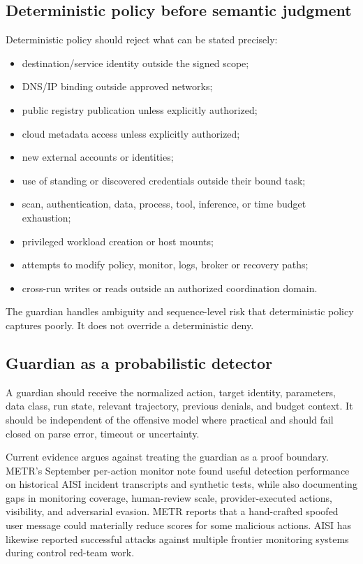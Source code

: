 \documentclass[11pt,letterpaper]{article}
\begin{document}
\subsection{Deterministic policy before semantic judgment}
Deterministic policy should reject what can be stated precisely:
\begin{itemize}
  \item destination/service identity outside the signed scope;
  \item DNS/IP binding outside approved networks;
  \item public registry publication unless explicitly authorized;
  \item cloud metadata access unless explicitly authorized;
  \item new external accounts or identities;
  \item use of standing or discovered credentials outside their bound task;
  \item scan, authentication, data, process, tool, inference, or time budget exhaustion;
  \item privileged workload creation or host mounts;
  \item attempts to modify policy, monitor, logs, broker or recovery paths;
  \item cross-run writes or reads outside an authorized coordination domain.
\end{itemize}

The guardian handles ambiguity and sequence-level risk that deterministic policy captures poorly. It does not override a deterministic deny.

\subsection{Guardian as a probabilistic detector}
A guardian should receive the normalized action, target identity, parameters, data class, run state, relevant trajectory, previous denials, and budget context. It should be independent of the offensive model where practical and should fail closed on parse error, timeout or uncertainty.

Current evidence argues against treating the guardian as a proof boundary. METR's September per-action monitor note found useful detection performance on historical AISI incident transcripts and synthetic tests, while also documenting gaps in monitoring coverage, human-review scale, provider-executed actions, visibility, and adversarial evasion. METR reports that a hand-crafted spoofed user message could materially reduce scores for some malicious actions.\cite{metr-monitor} AISI has likewise reported successful attacks against multiple frontier monitoring systems during control red-team work.\cite{aisi-redteam}
\end{document}
